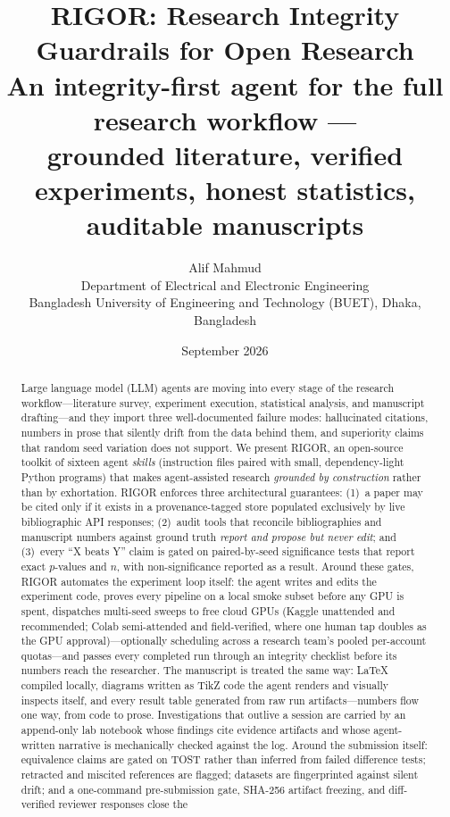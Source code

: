 \documentclass[11pt]{article}
\title{RIGOR: Research Integrity Guardrails for Open Research\\
\large An integrity-first agent for the full research workflow ---\\
grounded literature, verified experiments, honest statistics, auditable manuscripts}
\author{Alif Mahmud\\
\small Department of Electrical and Electronic Engineering\\
\small Bangladesh University of Engineering and Technology (BUET), Dhaka, Bangladesh}
\date{September 2026}
\begin{document}
\maketitle

\begin{abstract}
Large language model (LLM) agents are moving into every stage of the research
workflow---literature survey, experiment execution, statistical analysis, and
manuscript drafting---and they import three well-documented failure modes:
hallucinated citations, numbers in prose that silently drift from the data
behind them, and superiority claims that random seed variation does not
support. We present RIGOR, an open-source toolkit of sixteen agent
\emph{skills} (instruction files paired with small, dependency-light Python
programs) that makes agent-assisted research \emph{grounded by construction}
rather than by exhortation. RIGOR enforces three architectural guarantees:
(1)~a paper may be cited only if it exists in a provenance-tagged store
populated exclusively by live bibliographic API responses; (2)~audit tools
that reconcile bibliographies and manuscript numbers against ground truth
\emph{report and propose but never edit}; and (3)~every ``X beats Y'' claim is
gated on paired-by-seed significance tests that report exact $p$-values and
$n$, with non-significance reported as a result. Around these gates, RIGOR
automates the experiment loop itself: the agent writes and edits the
experiment code, proves every pipeline on a local smoke subset before any
GPU is spent, dispatches multi-seed sweeps to free cloud GPUs (Kaggle
unattended and recommended; Colab semi-attended and field-verified, where one
human tap doubles as the GPU
approval)---optionally scheduling across a research team's pooled per-account
quotas---and passes every completed run through an integrity checklist
before its numbers reach the researcher. The manuscript is treated the same
way: \LaTeX{} compiled locally, diagrams written as TikZ code the agent
renders and visually inspects itself, and every result table generated from
raw run artifacts---numbers flow one way, from code to prose. Investigations
that outlive a session are carried by an append-only lab notebook whose
findings cite evidence artifacts and whose agent-written narrative is
mechanically checked against the log. Around the submission itself:
equivalence claims are gated on TOST rather than inferred from failed
difference tests; retracted and miscited references are flagged; datasets are
fingerprinted against silent drift; and a one-command pre-submission gate,
SHA-256 artifact freezing, and diff-verified reviewer responses close the

\end{abstract}
\end{document}
